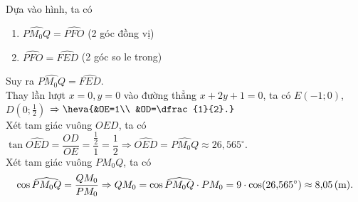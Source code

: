 \begin{ex}
{	Dựa vào hình, ta có
	\begin{enumerate}[+)]
		\item $\widehat{PM_0Q}=\widehat{PFO}$ (2 góc đồng vị)
		\item $\widehat{PFO}=\widehat{FED}$ (2 góc so le trong)
	\end{enumerate}
	Suy ra $\widehat{PM_0Q}=\widehat{FED}$.\\
	Thay lần lượt $x=0, y=0$ vào đường thẳng $x+2y+1=0$, ta có $E(-1;0)$, $D\left(0;\frac{1}{2}\right)$ $\Rightarrow \heva{&OE=1\\ &OD=\dfrac{1}{2}.}$\\
	Xét tam giác vuông $OED$, ta có $\tan\widehat{OED}=\dfrac{OD}{OE}=\dfrac{\frac{1}{2}}{1} =\dfrac{1}{2} \Rightarrow \widehat{OED}=\widehat{PM_0Q}\approx26{,}565^\circ$.\\
	Xét tam giác vuông $PM_0Q$, ta có $$\cos\widehat{PM_0Q}=\dfrac{QM_0}{PM_0} \Rightarrow QM_0=\cos\widehat{PM_0Q}\cdot PM_0 =9\cdot\cos(26{,}565^\circ)\approx8{,}05\, (\rm m).$$
	}
\end{ex}

